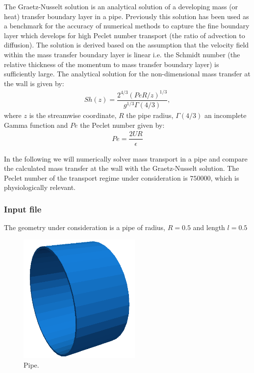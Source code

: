 The Graetz-Nusselt solution is an analytical solution of a developing mass (or
heat) transfer boundary layer in a pipe. Previously this solution has been used
as a benchmark for the accuracy of numerical methods to capture the fine
boundary layer which develops for high Peclet number transport (the ratio of
advection to diffusion). The solution is derived based on the assumption that
the velocity field within the mass transfer boundary layer is linear i.e. the
Schmidt number (the relative thickness of the momentum to mass transfer boundary
layer) is sufficiently large. The analytical solution for the non-dimensional
mass transfer at the wall is given by:
\begin{align*}
S h(z) = \dfrac{2^{4/3}(Pe R/z)^{1/3}}{g^{1/3}\Gamma(4/3)} , 
\end{align*}
where $z$ is the streamwise coordinate, $R$ the pipe radius, $\Gamma(4/3)$ an incomplete 
Gamma function and $Pe$ the Peclet number given by:
\begin{align*}
Pe = \dfrac{2 U R}{\epsilon}
\end{align*}

In the following we will numerically solver mass transport in a pipe and compare
the calculated mass transfer at the wall with the Graetz-Nusselt solution. The
Peclet number of the transport regime under consideration is $750000$, which is
physiologically relevant.

\subsubsection{Input file}
The geometry under consideration is a pipe of radius, $R = 0.5$ and length $l =
0.5$

\begin{figure}[h!]
\begin{center}
\includegraphics[width=6cm]{img/pipe}
\caption{Pipe.}
\end{center}
\end{figure}

